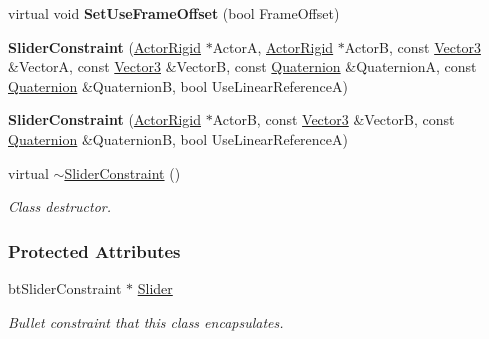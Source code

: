 \begin{DoxyCompactItemize}
\item 
\hypertarget{classphys_1_1SliderConstraint_a2662dcf07cca2da191dcd5e1e5f84b94}{
virtual void {\bfseries SetUseFrameOffset} (bool FrameOffset)}
\label{classphys_1_1SliderConstraint_a2662dcf07cca2da191dcd5e1e5f84b94}

\item 
\hypertarget{classphys_1_1SliderConstraint_ad1f8a2af927190365225b1310a0a2765}{
{\bfseries SliderConstraint} (\hyperlink{classphys_1_1ActorRigid}{ActorRigid} $\ast$ActorA, \hyperlink{classphys_1_1ActorRigid}{ActorRigid} $\ast$ActorB, const \hyperlink{classphys_1_1Vector3}{Vector3} \&VectorA, const \hyperlink{classphys_1_1Vector3}{Vector3} \&VectorB, const \hyperlink{classphys_1_1Quaternion}{Quaternion} \&QuaternionA, const \hyperlink{classphys_1_1Quaternion}{Quaternion} \&QuaternionB, bool UseLinearReferenceA)}
\label{classphys_1_1SliderConstraint_ad1f8a2af927190365225b1310a0a2765}

\item 
\hypertarget{classphys_1_1SliderConstraint_a907e08cc7e6784fff0d24a0c194a6b9c}{
{\bfseries SliderConstraint} (\hyperlink{classphys_1_1ActorRigid}{ActorRigid} $\ast$ActorB, const \hyperlink{classphys_1_1Vector3}{Vector3} \&VectorB, const \hyperlink{classphys_1_1Quaternion}{Quaternion} \&QuaternionB, bool UseLinearReferenceA)}
\label{classphys_1_1SliderConstraint_a907e08cc7e6784fff0d24a0c194a6b9c}

\item 
virtual \hyperlink{classphys_1_1SliderConstraint_ac636e7fe4fa5119860201c10b6b64208}{$\sim$SliderConstraint} ()
\begin{DoxyCompactList}\small\item\em Class destructor. \item\end{DoxyCompactList}\end{DoxyCompactItemize}
\subsubsection*{Protected Attributes}
\begin{DoxyCompactItemize}
\item 
\hypertarget{classphys_1_1SliderConstraint_ae99629f3e87f72d3271ff82137fa81e2}{
btSliderConstraint $\ast$ \hyperlink{classphys_1_1SliderConstraint_ae99629f3e87f72d3271ff82137fa81e2}{Slider}}
\label{classphys_1_1SliderConstraint_ae99629f3e87f72d3271ff82137fa81e2}

\begin{DoxyCompactList}\small\item\em Bullet constraint that this class encapsulates. \item\end{DoxyCompactList}\end{DoxyCompactItemize}


